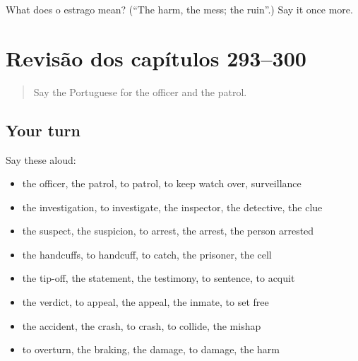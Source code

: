 \begin{tcolorbox}[breakable,colback=teal!4,colframe=teal!35!black,title={Before you move on}]
What does o estrago mean? (\textquotedblleft{}The harm, the mess; the ruin\textquotedblright{}.) Say it once more.
\end{tcolorbox}
\section[(dialogue)]{Revisão dos capítulos 293–300}

\label{lesson:PT-R300-revisao-293-300}



\begin{quote}
Say the Portuguese for the officer and the patrol.
\end{quote}

\subsection*{Your turn}
Say these aloud:

\begin{itemize}
\raggedright
  \item the officer, the patrol, to patrol, to keep watch over, surveillance
  \item the investigation, to investigate, the inspector, the detective, the clue
  \item the suspect, the suspicion, to arrest, the arrest, the person arrested
  \item the handcuffs, to handcuff, to catch, the prisoner, the cell
  \item the tip-off, the statement, the testimony, to sentence, to acquit
  \item the verdict, to appeal, the appeal, the inmate, to set free
  \item the accident, the crash, to crash, to collide, the mishap
  \item to overturn, the braking, the damage, to damage, the harm
\end{itemize}

